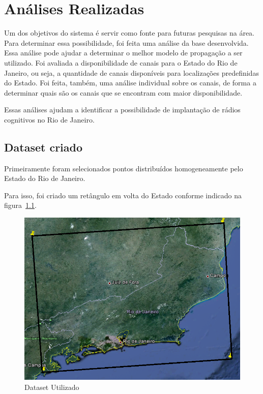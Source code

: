 \chapter{Análises Realizadas}

	Um dos objetivos do sistema é servir como fonte para futuras pesquisas na área. Para determinar essa possibilidade, foi feita uma análise da base desenvolvida. Essa análise pode ajudar a determinar o melhor modelo de propagação a ser utilizado. Foi avaliada a disponibilidade de canais para o Estado do Rio de Janeiro, ou seja, a quantidade de canais disponíveis para localizações predefinidas do Estado. Foi feita, também, uma análise individual sobre os canais, de forma a determinar quais são os canais que se encontram com maior disponibilidade.

	Essas análises ajudam a identificar a possibilidade de implantação de rádios cognitivos no Rio de Janeiro.

\section{Dataset criado}

Primeiramente foram selecionados pontos distribuídos homogeneamente pelo Estado do Rio de Janeiro.

Para isso, foi criado um retângulo em volta do Estado conforme indicado na figura~\ref{fig:datasetrec}.

\begin{figure}[htb]
\centering
\includegraphics[width=1.0\textwidth]{figs/datasetrec}
\caption[Dataset Utilizado]
{Dataset Utilizado}
\label{fig:datasetrec}
\end{figure} 


